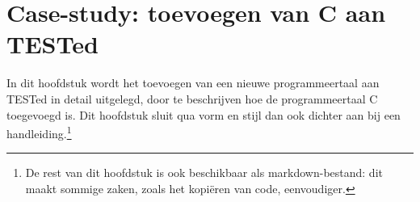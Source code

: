 \chapter{Case-study: toevoegen van C aan TESTed}\label{ch:nieuwe-taal}

In dit hoofdstuk wordt het toevoegen van een nieuwe programmeertaal aan TESTed in detail uitgelegd, door te beschrijven hoe de programmeertaal C toegevoegd is.
Dit hoofdstuk sluit qua vorm en stijl dan ook dichter aan bij een handleiding.\footnote{De rest van dit hoofdstuk is ook beschikbaar als markdown-bestand: dit maakt sommige zaken, zoals het kopiëren van code, eenvoudiger.}


